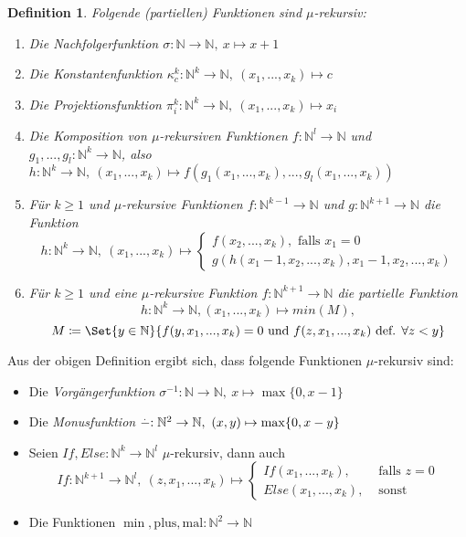 \documentclass{cheat-sheet}
\newcommand{\monus}{\stackrel{{}^{\scriptstyle .}}{\smash{-}}}
\newtheorem*{definition}{Definition}
\begin{document}
\begin{definition}
  Folgende (partiellen) Funktionen sind \emph{$\mu$-rekursiv}:
  \begin{enumerate}
    \item Die \it{Nachfolgerfunktion} $\sigma : \mathbb{N} \to \mathbb{N},\ x \mapsto x + 1$
    \item Die \it{Konstantenfunktion} $\kappa_{c}^{k} : \mathbb{N}^{k} \to \mathbb{N},\ (x_{1}, ..., x_{k}) \mapsto c$
    \item Die \it{Projektionsfunktion} $\pi_{i}^{k} : \mathbb{N}^{k} \to \mathbb{N},\ (x_{1}, ..., x_{k}) \mapsto x_{i}$
    \item Die \it{Komposition} von $\mu$-rekursiven Funktionen $f : \mathbb{N}^{l} \to \mathbb{N}$ und $g_{1}, ..., g_{l} : \mathbb{N}^{k} \to \mathbb{N}$, also $h : \mathbb{N}^{k} \to \mathbb{N},\ (x_{1}, ..., x_{k}) \mapsto f(g_{1}(x_{1}, ..., x_{k}), ..., g_{l}(x_{1}, ..., x_{k}))$
    \item Für $k \ge 1$ und $\mu$-rekursive Funktionen $f : \mathbb{N}^{k-1} \to \mathbb{N}$ und $g : \mathbb{N}^{k + 1} \to \mathbb{N}$ die Funktion
      { \scriptsize
      \[ h : \mathbb{N}^{k} \to \mathbb{N},\ (x_{1}, ..., x_{k}) \mapsto \begin{cases} f(x_{2}, ..., x_{k}), \text{ falls } x_{1} = 0 \\ g(h(x_{1} - 1, x_{2}, ..., x_{k}), x_{1} - 1, x_{2}, ..., x_{k}) \end{cases} \]
      }
    \item Für $k \ge 1$ und eine $\mu$-rekursive Funktion $f : \mathbb{N}^{k + 1} \to \mathbb{N}$ die partielle Funktion
      { \scriptsize
      \[ h : \mathbb{N}^{k} \to \mathbb{N}, (x_{1}, ..., x_{k}) \mapsto min(M), \]
      \[ M \coloneqq \Set{ y \in \mathbb{N} }{ f(y, x_1, ..., x_k) = 0 \text{ und } f(z, x_1, ..., x_k) \text{ def. } \forall z < y } \]
      }
  \end{enumerate}
\end{definition}

\begin{bem}
Aus der obigen Definition ergibt sich, dass folgende Funktionen $\mu$-rekursiv sind:
\begin{itemize}
  \item Die \it{Vorgängerfunktion} $\sigma^{-1} : \mathbb{N} \to \mathbb{N},\ x \mapsto \max\{0, x - 1\}$
  \item Die \it{Monusfunktion} $\monus : \mathbb{N}^{2} \to \mathbb{N},\ (x, y) \mapsto \max\{0, x - y\}$
  \item Seien $If, Else : \mathbb{N}^k \to \mathbb{N}^{l}$ $\mu$-rekursiv, dann auch
    \[ If : \mathbb{N}^{k + 1} \to \mathbb{N}^{l},\ (z, x_1, ..., x_k) \mapsto \begin{cases}If(x_1, ..., x_k), & \text{ falls } z = 0\\Else(x_1, ..., x_k), & \text{ sonst }\end{cases} \]
  \item Die Funktionen $\min, \mathrm{plus}, \mathrm{mal} : \mathbb{N}^2 \to \mathbb{N}$

\end{itemize}
\end{bem}
\end{document}

